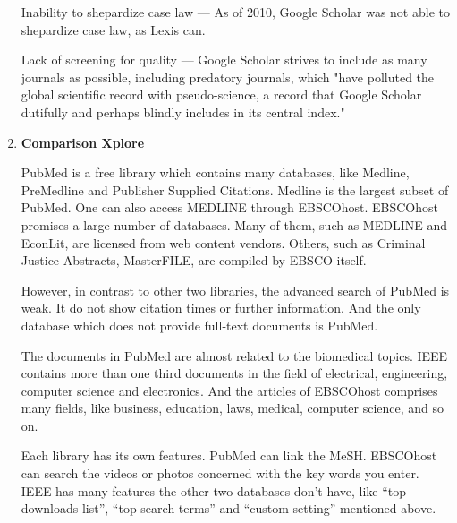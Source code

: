 \begin{enumerate}
	Inability to shepardize case law — As of 2010, Google Scholar was not able to shepardize case law, as Lexis can.
	
	Lack of screening for quality — Google Scholar strives to include as many journals as possible, including predatory journals, which "have polluted the global scientific record with pseudo-science, a record that Google Scholar dutifully and perhaps blindly includes in its central index."\\
	
	\item\textbf{Comparison Xplore}
	\setlength{\parindent}{1em}
	
	PubMed is a free library which contains many databases, like Medline, PreMedline and Publisher Supplied Citations.
    Medline is the largest subset of PubMed.
    One can also access MEDLINE through EBSCOhost.  
    EBSCOhost promises a large number of databases. 
	Many of them, such as MEDLINE and EconLit, are licensed from web content vendors.
    Others, such as Criminal Justice Abstracts, MasterFILE, are compiled by EBSCO itself.

    However, in contrast to other two libraries, the advanced search of PubMed is weak. 
    It do not show citation times or further information.
    And the only database which does not provide full-text documents is PubMed. 

    The documents in PubMed are almost related to the biomedical topics.
    IEEE contains more than one third documents in the field of electrical, engineering, computer science and electronics.
    And the articles of EBSCOhost comprises many fields, like business, education, laws, medical, computer science, and so on.

    Each library has its own features. PubMed can link the MeSH. EBSCOhost can search the videos or photos concerned with the key words you enter. 
    IEEE has many features the other two databases don’t have, like “top downloads list”, “top search terms” and “custom setting” mentioned above.

    

\end{enumerate}

